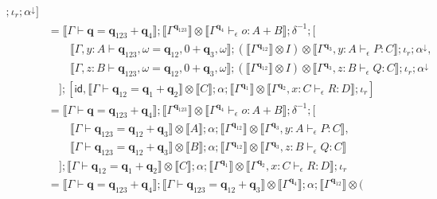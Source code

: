 \documentclass[acmsmall,screen,review]{acmart}
\newcommand{\mb}[1]{\ensuremath{\mathbf{#1}}}
\newcommand{\ms}[1]{\ensuremath{\mathsf{#1}}}
\newcommand{\qsp}[4]{#1 \vdash #2 = #3 + #4}
\newcommand{\hasty}[4]{#1 \vdash_{#2} #3: {#4}}
\newcommand{\dnt}[1]{\llbracket{#1}\rrbracket}
\begin{document}
\begin{itemize}
\begin{align*}
            ; \iota_r
            ; \alpha^\downarrow
      ] \\
    & = \dnt{\qsp{\Gamma}{\mb{q}}{\mb{q}_{123}}{\mb{q}_4}} 
      ; \dnt{\Gamma^{\mb{q}_{123}}} \otimes \dnt{\hasty{\Gamma^{\mb{q}_4}}{\epsilon}{o}{A + B}}
      ; \delta^{-1} ;[ \\ & \qquad
          \dnt{\qsp{\Gamma, y : A}{\mb{q}_{123}, \omega}{\mb{q}_{12}, 0}{\mb{q}_3, \omega}}
          ; (\dnt{\Gamma^{\mb{q}_{12}}} \otimes I) 
              \otimes \dnt{\hasty{\Gamma^{\mb{q}_3}, y : A}{\epsilon}{P}{C}}
          ; \iota_r
          ; \alpha^\downarrow, \\ & \qquad
          \dnt{\qsp{\Gamma, z : B}{\mb{q}_{123}, \omega}{\mb{q}_{12}, 0}{\mb{q}_3, \omega}}
          ; (\dnt{\Gamma^{\mb{q}_{12}}} \otimes I) 
              \otimes \dnt{\hasty{\Gamma^{\mb{q}_3}, z : B}{\epsilon}{Q}{C}}
          ; \iota_r
          ; \alpha^\downarrow
      \\ & \quad
      ];[
        \ms{id}, 
        \dnt{\qsp{\Gamma}{\mb{q}_{12}}{\mb{q}_1}{\mb{q}_2}} \otimes \dnt{C}
            ; \alpha
            ; \dnt{\Gamma^{\mb{q}_1}} 
              \otimes \dnt{\hasty{\Gamma^{\mb{q}_2}, x : C}{\epsilon}{R}{D}}
            ; \iota_r
      ] \\
      &= \dnt{\qsp{\Gamma}{\mb{q}}{\mb{q}_{123}}{\mb{q}_4}} 
      ; \dnt{\Gamma^{\mb{q}_{123}}} \otimes \dnt{\hasty{\Gamma^{\mb{q}_4}}{\epsilon}{o}{A + B}}
      ; \delta^{-1} ;[ \\ & \qquad
          \dnt{\qsp{\Gamma}{\mb{q}_{123}}{\mb{q}_{12}}{\mb{q}_3}} \otimes \dnt{A}
          ; \alpha
          ; \dnt{\Gamma^{\mb{q}_{12}}} 
            \otimes \dnt{\hasty{\Gamma^{\mb{q}_3}, y : A}{\epsilon}{P}{C}}, \\ & \qquad
          \dnt{\qsp{\Gamma}{\mb{q}_{123}}{\mb{q}_{12}}{\mb{q}_3}} \otimes \dnt{B}
          ; \alpha
          ; \dnt{\Gamma^{\mb{q}_{12}}} 
            \otimes \dnt{\hasty{\Gamma^{\mb{q}_3}, z : B}{\epsilon}{Q}{C}}
      \\ & \quad
      ]
      ; \dnt{\qsp{\Gamma}{\mb{q}_{12}}{\mb{q}_1}{\mb{q}_2}} \otimes \dnt{C}
      ; \alpha
      ; \dnt{\Gamma^{\mb{q}_1}} 
        \otimes \dnt{\hasty{\Gamma^{\mb{q}_2}, x : C}{\epsilon}{R}{D}}
      ; \iota_r
      \\
      &= \dnt{\qsp{\Gamma}{\mb{q}}{\mb{q}_{123}}{\mb{q}_4}} 
      ; \dnt{\qsp{\Gamma}{\mb{q}_{123}}{\mb{q}_{12}}{\mb{q}_3}} 
        \otimes \dnt{\Gamma^{\mb{q}_4}}
      ; \alpha
      ; \dnt{\Gamma^{\mb{q}_{12}}} \otimes ( \\ & \qquad

\end{align*}
\end{itemize}
\end{document}
